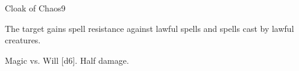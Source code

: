\begin{spellsection}{Cloak of Chaos}{9}
\begin{spellheader}
\end{spellheader}
\begin{spellcontent}
    \begin{spelltargetinginfo}
    \end{spelltargetinginfo}
    \begin{spelleffects}
        \spelleffect The target gains spell resistance against lawful spells and spells cast by lawful creatures.
        \spelldur \durshort \dismissable
    \end{spelleffects}
\end{spellcontent}
\begin{spellsubcontent}
    \begin{spelltargetinginfo}
    \end{spelltargetinginfo}
    \begin{spelleffects}
        \begin{spellattack}{Magic vs. Will}
            \spellsuccess {}[d6].
            \spellfailure Half damage.
        \end{spellattack}
    \end{spelleffects}
\end{spellsubcontent}
\begin{spellfooter}
\end{spellfooter}
\end{spellsection}

